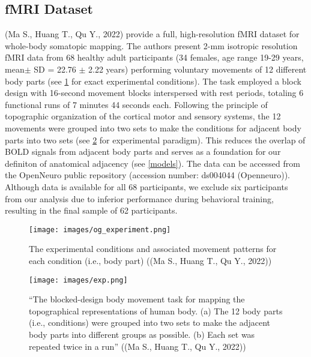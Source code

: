 \documentclass{article}
\begin{document}
\subsection{fMRI Dataset}
(Ma S., Huang T., Qu Y., 2022) provide a full, high-resolution fMRI dataset for whole-body somatopic mapping. The authors present 2-mm isotropic resolution fMRI data from 68 healthy adult participants (34 females, age range 19-29 years, mean$ \pm$ SD = 22.76 $\pm$ 2.22 years) performing voluntary movements of 12 different body parts (see \ref{fig:og-exp} for exact experimental conditions). The task employed a block design with 16-second movement blocks interspersed with rest periods, totaling 6 functional runs of 7 minutes 44 seconds each. Following the principle of topographic organization of the cortical motor and sensory systems, the 12 movements were grouped into two sets to make the conditions for adjacent body parts into two sets (see \ref{fig:exp} for experimental paradigm). This reduces the overlap of BOLD signals from adjacent body parts and serves as a foundation for our definiton of anatomical adjacency (see \ref{models}). The data can be accessed from the OpenNeuro public repository (accession number: ds004044 (Openneuro)). Although data is available for all 68 participants, we exclude six participants from our analysis due to inferior performance during behavioral training, resulting in the final sample of 62 participants.
\begin{figure}
    \centering
    \texttt{[image: images/og\_experiment.png]}
    \caption{The experimental conditions and associated movement patterns for each condition (i.e., body part) ((Ma S., Huang T., Qu Y., 2022))}
    \label{fig:og-exp}
\end{figure}
\begin{figure}
    \centering
    \texttt{[image: images/exp.png]}
    \caption{``The blocked-design body movement task for mapping the topographical representations of human body. (a) The 12 body parts (i.e., conditions) were grouped into two sets to make the adjacent body parts into different groups as possible. (b) Each set was repeated twice in a run'' ((Ma S., Huang T., Qu Y., 2022))}
    \label{fig:exp}
\end{figure}
\end{document}
